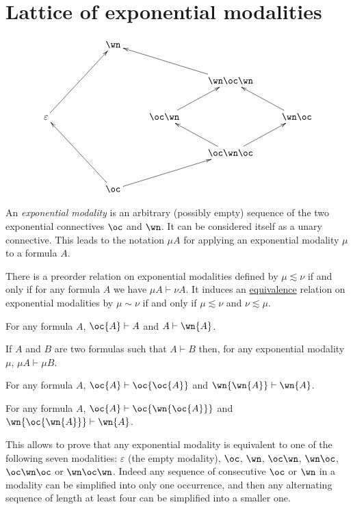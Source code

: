 \section{Lattice of exponential modalities}\label{lattice-of-exponential-modalities}

\begin{equation*}
\xymatrix{
 & & {\wn} \\
 & & & & {\wn\oc\wn}\ar[ull] \\
\varepsilon\ar[uurr] & & & {\oc\wn} \ar[ur] & & {\wn\oc} \ar[ul] \\
 & & & & {\oc\wn\oc} \ar[ul]\ar[ur] \\
 & & {\oc} \ar[uull]\ar[urr]
}
\end{equation*}

An \emph{exponential modality} is an arbitrary (possibly empty) sequence
of the two exponential connectives \(\oc\) and \(\wn\). It can be
considered itself as a unary connective. This leads to the notation
\(\mu A\) for applying an exponential modality \(\mu\) to a formula
\(A\).

There is a preorder relation on exponential modalities defined by
\(\mu\lesssim\nu\) if and only if for any formula \(A\) we have
\(\mu A\vdash \nu A\). It induces an
\hyperref[list-of-equivalences]{equivalence} relation on exponential
modalities by \(\mu \sim \nu\) if and only if \(\mu\lesssim\nu\) and
\(\nu\lesssim\mu\).

\begin{lemma}
For any formula $A$, $\oc{A}\vdash A$ and $A\vdash\wn{A}$.
\end{lemma}

\begin{lemma}[Functoriality]
If $A$ and $B$ are two formulas such that $A\vdash B$ then, for any exponential modality $\mu$, $\mu A\vdash \mu B$.
\end{lemma}

\begin{lemma}
For any formula $A$, $\oc{A}\vdash \oc{\oc{A}}$ and $\wn{\wn{A}}\vdash\wn{A}$.
\end{lemma}

\begin{lemma}
For any formula $A$, $\oc{A}\vdash \oc{\wn{\oc{A}}}$ and $\wn{\oc{\wn{A}}}\vdash\wn{A}$.
\end{lemma}

This allows to prove that any exponential modality is equivalent to one
of the following seven modalities: \(\varepsilon\) (the empty modality),
\(\oc\), \(\wn\), \(\oc\wn\), \(\wn\oc\), \(\oc\wn\oc\) or
\(\wn\oc\wn\). Indeed any sequence of consecutive \(\oc\) or \(\wn\) in
a modality can be simplified into only one occurrence, and then any
alternating sequence of length at least four can be simplified into a
smaller one.

